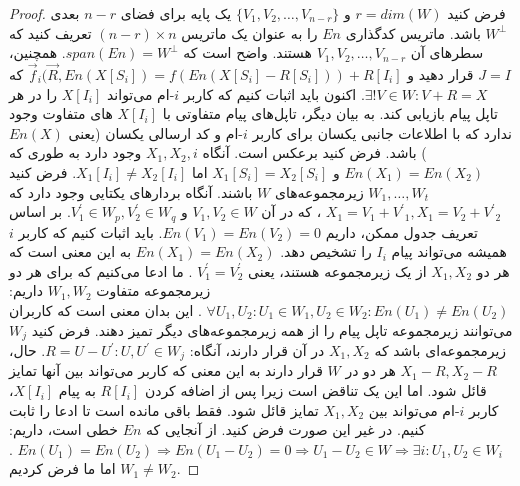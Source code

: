 \begin{proof}
    فرض کنید 
    $r = dim(W)$
     و $\{V_1, V_2, \ldots, V_{n - r} \}$ 
     یک پایه برای فضای $n - r$ بعدی $W^\bot$ باشد. ماتریس کدگذاری $En$ را به عنوان یک ماتریس 
     $(n - r) \times n $
      تعریف کنید که سطرهای آن 
      $V_1, V_2, \ldots, V_{n - r}$
       هستند. واضح است که 
      $span(En) = W^\bot$.
       همچنین، $J = I$ قرار دهید و 
       $\overrightarrow{f}_i(\overrightarrow{R}, En(X[S_i]) = f(En(X[S_i] - R[S_i])) + R[I_i]$ که $\exists! V \in W: V + R = X $.
    اکنون باید اثبات کنیم که کاربر $i$-ام می‌تواند $X[I_i]$ را در هر تاپل پیام بازیابی کند. به بیان دیگر، تاپل‌های پیام متفاوتی با 
    $X[I_i]$‌
    های متفاوت وجود ندارد که با اطلاعات جانبی یکسان برای کاربر
     $i$-ام
      و کد ارسالی یکسان (یعنی
       $En(X)$
       ) باشد. فرض کنید برعکس است. آنگاه 
     $X_1, X_2, i$ وجود دارد به طوری که 
     $En(X_1) = En(X_2)$ و 
     $X_1[S_i] = X_2[S_i]$ اما 
     $X_1[I_i] \neq X_2[I_i]$. فرض کنید 
     $W_1, \ldots, W_t$ زیرمجموعه‌های 
     $W$ باشند. آنگاه بردارهای یکتایی وجود دارد که 
     $X_1 = V_1 + {V^\prime}_1, X_1 = V_2 + {V^\prime}_2$
     ، که در آن 
     $V_1, V_2 \in W$
      و 
      $V^\prime_1 \in W_p, V^\prime_2 \in W_q$.
    بر اساس تعریف جدول ممکن، داریم
     $En(V_1) = En(V_2) = 0$.
    باید اثبات کنیم که کاربر $i$ همیشه می‌تواند پیام $I_i$ را تشخیص دهد. 
    $En(X_1) = En(X_2)$
     به این معنی است که هر دو 
    $X_1, X_2$
     از یک زیرمجموعه هستند، یعنی 
    $V^\prime_1 = V^\prime_2$
    . ما ادعا می‌کنیم که برای هر دو زیرمجموعه متفاوت $W_1, W_2$ داریم: 
    $\forall U_1, U_2: U_1 \in W_1, U_2 \in W_2: En(U_1) \neq En(U_2)$
    . این بدان معنی است که کاربران می‌توانند زیرمجموعه تاپل پیام را از همه زیرمجموعه‌های دیگر تمیز دهند. فرض کنید $W_j$ زیرمجموعه‌ای باشد که 
    $X_1, X_2$
     در آن قرار دارند، آنگاه: 
     $R = U - U^\prime: U, U^\prime \in W_j$. 
     حال، 
     $X_1 - R, X_2 - R$ 
     هر دو در $W$ قرار دارند به این معنی که کاربر می‌تواند بین آنها تمایز قائل شود. اما این یک تناقض است زیرا پس از اضافه کردن $R[I_i]$ به پیام $X[I_i]$، کاربر $i$-ام می‌تواند بین $X_1, X_2$ تمایز قائل شود.
    فقط باقی مانده است تا ادعا را ثابت کنیم. در غیر این صورت فرض کنید. از آنجایی که $En$ خطی است، داریم: 
    $En(U_1) = En(U_2) \Rightarrow En(U_1 - U_2) = 0 \Rightarrow U_1 - U_2 \in W \Rightarrow \exists i: U_1, U_2 \in W_i$
    . اما ما فرض کردیم
     $W_1 \neq W_2$.
\end{proof}

